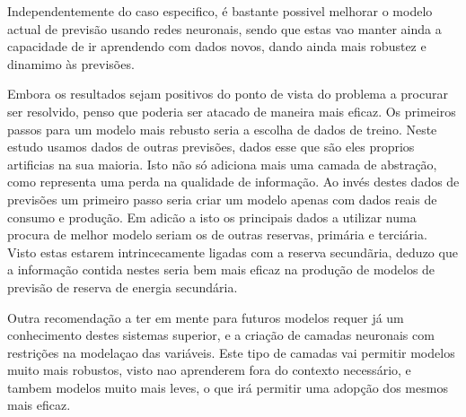 Independentemente do caso especifico, é bastante possivel melhorar o modelo actual de previsão usando redes neuronais, sendo que estas vao manter ainda a capacidade de ir aprendendo com dados novos, dando ainda mais robustez e dinamimo às previsões.


Embora os resultados sejam positivos do ponto de vista do problema a procurar ser resolvido, penso que poderia ser atacado de maneira mais eficaz.
Os primeiros passos para um modelo mais rebusto seria a escolha de dados de treino. Neste estudo usamos dados de outras previsões, dados esse que são eles proprios artificias na sua maioria. Isto não só adiciona mais uma camada de abstração, como representa uma perda na qualidade de informação.
Ao invés destes dados de previsões um primeiro passo seria criar um modelo apenas com dados reais de consumo e produção.
Em adicão a isto os principais dados a utilizar numa procura de melhor modelo seriam os de outras reservas, primária e terciária. Visto estas estarem intrincecamente ligadas com a reserva secundãria, deduzo que a informação contida nestes seria bem mais eficaz na produção de modelos de previsão de reserva de energia secundária.

Outra recomendação a ter em mente para futuros modelos requer já um conhecimento destes sistemas superior, e a criação de camadas neuronais com restrições na modelaçao das variáveis. Este tipo de camadas vai permitir modelos muito mais robustos, visto nao aprenderem fora do contexto necessário, e tambem modelos muito mais leves, o que irá permitir uma adopção dos mesmos mais eficaz.
